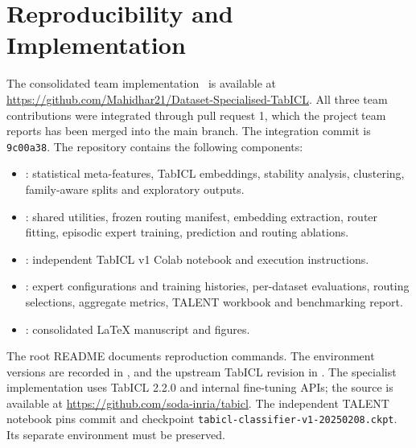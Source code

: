 \documentclass[conference]{IEEEtran}
\begin{document}
\section{Reproducibility and Implementation}
The consolidated team implementation~\cite{project} is available at \url{https://github.com/Mahidhar21/Dataset-Specialised-TabICL}. All three team contributions were integrated through pull request 1, which the project team reports has been merged into the main branch. The integration commit is \texttt{9c00a38}. The repository contains the following components:
\begin{itemize}
\item {}: statistical meta-features, TabICL embeddings, stability analysis, clustering, family-aware splits and exploratory outputs.
\item {}: shared utilities, frozen routing manifest, embedding extraction, router fitting, episodic expert training, prediction and routing ablations.
\item {}: independent TabICL v1 Colab notebook and execution instructions.
\item {}: expert configurations and training histories, per-dataset evaluations, routing selections, aggregate metrics, TALENT workbook and benchmarking report.
\item {}: consolidated LaTeX manuscript and figures.
\end{itemize}
The root README documents reproduction commands. The environment versions are recorded in , and the upstream TabICL revision in . The specialist implementation uses TabICL 2.2.0 and internal fine-tuning APIs; the source is available at \url{https://github.com/soda-inria/tabicl}. The independent TALENT notebook pins commit  and checkpoint \texttt{tabicl-classifier-v1-20250208.ckpt}. Its separate environment must be preserved.
\end{document}
